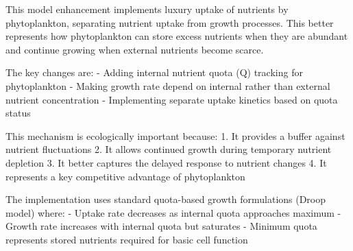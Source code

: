 This model enhancement implements luxury uptake of nutrients by phytoplankton, separating nutrient uptake from growth processes. This better represents how phytoplankton can store excess nutrients when they are abundant and continue growing when external nutrients become scarce.

The key changes are:
- Adding internal nutrient quota (Q) tracking for phytoplankton
- Making growth rate depend on internal rather than external nutrient concentration
- Implementing separate uptake kinetics based on quota status

This mechanism is ecologically important because:
1. It provides a buffer against nutrient fluctuations
2. It allows continued growth during temporary nutrient depletion
3. It better captures the delayed response to nutrient changes
4. It represents a key competitive advantage of phytoplankton

The implementation uses standard quota-based growth formulations (Droop model) where:
- Uptake rate decreases as internal quota approaches maximum
- Growth rate increases with internal quota but saturates
- Minimum quota represents stored nutrients required for basic cell function
